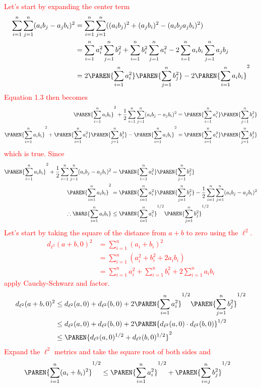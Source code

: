 \documentclass[10pt,a4paper]{report}
\newcommand{\RED}[1]{\textcolor{red}{#1}}
\begin{document}
\begin{enumerate}[label=\Roman*.]
\begin{description}
\RED{Let's start by expanding the center term\begin{align*}
	\sum_{i=1}^n\sum_{j=1}^n(a_ib_j-a_jb_i)^2 &= \sum_{i=1}^n\sum_{j=1}^n ( (a_ib_j)^2+(a_jb_i)^2 -(a_ib_ja_jb_i)^2)\\
	&= \sum_{i=1}^n a_i^2\sum_{j=1}^n b_j^2 + \sum_{i=1}^nb_i^2\sum_{j=1}^n a_i^2 - 2\sum_{i=1}^na_ib_i\sum_{j=1}^na_jb_j \\
	&= 2\PAREN{\sum_{i=1}^na_i^2}\PAREN{\sum_{j=1}^nb_j^2}-2\PAREN{\sum_{i=1}^na_ib_i}^2
\end{align*}Equation 1.3 then becomes
\begin{align*}
	\PAREN{\sum_{i=1}^na_ib_i}^2+\frac{1}{2}\sum_{i=1}^n\sum_{j=1}^n(a_ib_j-a_jb_i)^2= \PAREN{\sum_{i=1}^na_i^2}\PAREN{\sum_{j=1}^n b_j^2} \\
	\PAREN{\sum_{i=1}^na_ib_i}^2+\PAREN{\sum_{i=1}^na_i^2}\PAREN{\sum_{j=1}^nb_j^2}-\PAREN{\sum_{i=1}^na_ib_i}^2= \PAREN{\sum_{i=1}^na_i^2}\PAREN{\sum_{j=1}^n b_j^2}
\end{align*}which is true.  Since
\begin{align*}
	\PAREN{\sum_{i=1}^na_ib_i}^2+\frac{1}{2}\sum_{i=1}^n\sum_{j=1}^n(a_ib_j-a_jb_i)^2&= \PAREN{\sum_{i=1}^na_i^2}\PAREN{\sum_{j=1}^n b_j^2} \\
	\PAREN{\sum_{i=1}^na_ib_i}^2&=\PAREN{\sum_{i=1}^na_i^2}\PAREN{\sum_{j=1}^n b_j^2} - \frac{1}{2}\sum_{i=1}^n\sum_{j=1}^n(a_ib_j-a_jb_i)^2 \\
	\therefore \BARS{\sum_{i=1}^na_ib_i} &\le \PAREN{\sum_{i=1}^na_i^2}^{1/2}\PAREN{\sum_{j=1}^n b_j^2}^{1/2}
\end{align*}Let's start by taking the square of the distance from $a+b$ to zero using the $\ell^2$.
\begin{align*}
	d_{\ell^2}(a+b, 0)^2 &= \sum_{i=1}^n (a_i+b_i)^2 \\
	&= \sum_{i=1}^n (a_i^2 + b_i^2 + 2a_ib_i) \\
	&= \sum_{i=1}^n a_i^2 + \sum_{i=1}^nb_i^2 + 2\sum_{i=1}^na_ib_i 
\end{align*}apply Cauchy-Schwarz and factor.
\begin{align*}
	d_{\ell^2}(a+b, 0)^2 &\le d_{\ell^2}(a,0) + d_{\ell^2}(b, 0) + 2 \PAREN{\sum_{i=1}^na_i^2}^{1/2}\PAREN{\sum_{j=1}^n b_j^2}^{1/2} \\
	&\le d_{\ell^2}(a,0) + d_{\ell^2}(b, 0) + 2\PAREN{ d_{\ell^2}(a,0)\cdot d_{\ell^2}(b,0) }^{1/2} \\
	&\le \PAREN{ d_{\ell^2}(a,0)^{1/2} + d_{\ell^2}(b,0)^{1/2}}^2
\end{align*}Expand the $\ell^2$ metrics and take the square root of both sides and 
\begin{align*}
	\PAREN{\sum_{i=1}^n(a_i+b_i)^2}^{1/2} &\le \PAREN{\sum_{i=1}^n a_i^2}^{1/2}+\PAREN{\sum_{i=j}^n b_j^2}^{1/2}
\end{align*} }


\end{description}
\end{enumerate}
\end{document}
